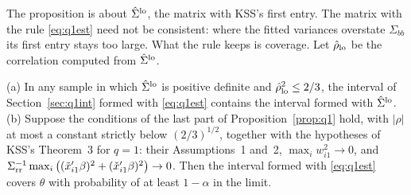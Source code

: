 The proposition is about $\hat\Sigma^{\rm lo}$, the matrix with KSS's first entry. The matrix with the rule
\eqref{eq:q1est} need not be consistent: where the fitted variances overstate $\Sigma_{bb}$ its first entry
stays too large. What the rule keeps is coverage. Let $\hat\rho_{\rm lo}$ be the correlation computed from
$\hat\Sigma^{\rm lo}$.

\begin{corollary}[Coverage]\label{cor:q1}
\textup{(a)} In any sample in which $\hat\Sigma^{\rm lo}$ is positive definite and $\hat\rho_{\rm lo}^2\le2/3$, the
interval of Section~\ref{sec:q1int} formed with \eqref{eq:q1est} contains the interval formed with
$\hat\Sigma^{\rm lo}$.
\textup{(b)} Suppose the conditions of the last part of Proposition~\ref{prop:q1} hold, with $|\rho|$ at most a
constant strictly below $(2/3)^{1/2}$, together with the hypotheses of KSS's Theorem~3 for $q=1$: their
Assumptions~1 and~2, $\max_iw_{i1}^2\to0$, and
$\Sigma_{\rm rr}^{-1}\max_i\big((\tilde x_{i1}'\beta)^2+(\check x_{i1}'\beta)^2\big)\to0$. Then the interval formed
with \eqref{eq:q1est} covers $\theta$ with probability of at least $1-\alpha$ in the limit.
\end{corollary}

